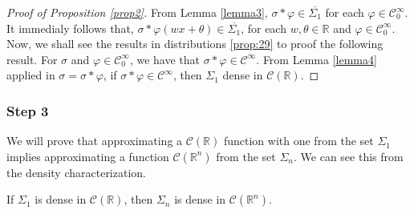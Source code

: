 \documentclass[../main.tex]{subfiles}
\begin{document}
\vspace{\baselineskip} 
	 \begin{proof}[Proof of Proposition \ref{prop2}]
	 From Lemma \ref{lemma3}, $\sigma \ast \varphi \in  \overline{\Sigma_1}$ for each $\varphi \in \mathcal{C}^\infty_0$. It immedialy follows that, $\sigma \ast \varphi (wx+\theta ) \in  \overline{\Sigma_1}$, for each $ w, \theta \in \mathbb{R}$ and $\varphi \in \mathcal{C}^\infty_0$.\\ 
	 Now, we shall see the results in distributions \ref{prop:29} to proof the following result. For $\sigma$ and $\varphi \in \mathcal{C}^\infty_0$, we have that $\sigma \ast \varphi \in  \mathcal{C}^\infty $.
	 From Lemma \ref{lemma4} applied in $\sigma= \sigma \ast \varphi$, if $\sigma \ast \varphi \in  \mathcal{C}^\infty $, then $\Sigma_1$ dense in $\mathcal{C} (\mathbb{R})$. 
	 \end{proof}
\vspace{\baselineskip} 
\subsubsection{Step 3}
\noindent We will prove that approximating a $\mathcal{C}(\mathbb{R})$ function  with one from the set $\Sigma_1$ implies approximating a function $\mathcal{C}(\mathbb{R}^n)$ from the set $\Sigma_n$. We can see this from the density characterization.

	\begin{propo}  %
			If $\Sigma_1$ is dense in $\mathcal{C}(\mathbb{R})$, then $\Sigma_n$ is dense in $\mathcal{C}(\mathbb{R}^n)$. 
		\end{propo}
	
\end{document}
